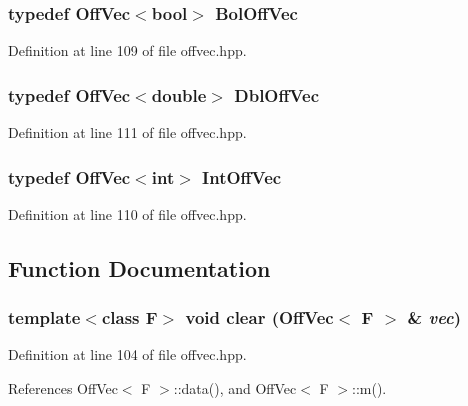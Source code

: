 \subsubsection{\setlength{\rightskip}{0pt plus 5cm}typedef {\bf Off\-Vec}$<$bool$>$ {\bf Bol\-Off\-Vec}}\label{offvec_8hpp_db3a2d7373afcc62f69944edb623af17_db3a2d7373afcc62f69944edb623af17}




Definition at line 109 of file offvec.hpp.
\subsubsection{\setlength{\rightskip}{0pt plus 5cm}typedef {\bf Off\-Vec}$<$double$>$ {\bf Dbl\-Off\-Vec}}\label{offvec_8hpp_e818d89ed9ebe35320937c12c5bc4005_e818d89ed9ebe35320937c12c5bc4005}




Definition at line 111 of file offvec.hpp.
\subsubsection{\setlength{\rightskip}{0pt plus 5cm}typedef {\bf Off\-Vec}$<$int$>$ {\bf Int\-Off\-Vec}}\label{offvec_8hpp_d2ef07f7f5f866ebafdae8d9fa754a6a_d2ef07f7f5f866ebafdae8d9fa754a6a}




Definition at line 110 of file offvec.hpp.

\subsection{Function Documentation}
\subsubsection{\setlength{\rightskip}{0pt plus 5cm}template$<$class F$>$ void clear ({\bf Off\-Vec}$<$ F $>$ \& {\em vec})\hspace{0.3cm}{\tt  [inline]}}\label{offvec_8hpp_4e949a879e2792b98518640c224a010a_4e949a879e2792b98518640c224a010a}




Definition at line 104 of file offvec.hpp.

References Off\-Vec$<$ F $>$::data(), and Off\-Vec$<$ F $>$::m().


